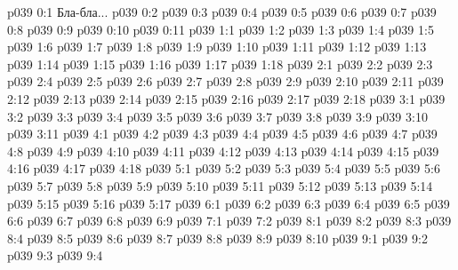 \author{Мелхиседек}
\vs p039 0:1  Бла-бла...
\vs p039 0:2 
\vs p039 0:3 
\vs p039 0:4 
\vs p039 0:5 
\vs p039 0:6 
\vs p039 0:7 
\vs p039 0:8 
\vs p039 0:9 \pc 
\vs p039 0:10 
\vs p039 0:11 
\vs p039 1:1 
\vs p039 1:2 
\vs p039 1:3 
\vs p039 1:4 \pc 
\vs p039 1:5 
\vs p039 1:6 
\vs p039 1:7 
\vs p039 1:8 
\vs p039 1:9 
\vs p039 1:10 
\vs p039 1:11 
\vs p039 1:12 
\vs p039 1:13 
\vs p039 1:14 
\vs p039 1:15 
\vs p039 1:16 
\vs p039 1:17 
\vs p039 1:18 
\vs p039 2:1 
\vs p039 2:2 
\vs p039 2:3 
\vs p039 2:4 
\vs p039 2:5 
\vs p039 2:6 
\vs p039 2:7 
\vs p039 2:8 
\vs p039 2:9 \pc 
\vs p039 2:10 \pc 
\vs p039 2:11 
\vs p039 2:12 
\vs p039 2:13 \pc 
\vs p039 2:14 
\vs p039 2:15 \pc 
\vs p039 2:16 
\vs p039 2:17 
\vs p039 2:18 \pc 
{}
\vs p039 3:1 
\vs p039 3:2 
\vs p039 3:3 
\vs p039 3:4 
\vs p039 3:5 
\vs p039 3:6 
\vs p039 3:7 
\vs p039 3:8 
\vs p039 3:9 
\vs p039 3:10 
\vs p039 3:11 
\vs p039 4:1 
\vs p039 4:2 
\vs p039 4:3 
\vs p039 4:4 
\vs p039 4:5 
\vs p039 4:6 
\vs p039 4:7 
\vs p039 4:8 
\vs p039 4:9 
\vs p039 4:10 
\vs p039 4:11 
\vs p039 4:12 \pc 
\vs p039 4:13 
\vs p039 4:14 
\vs p039 4:15 
\vs p039 4:16 
\vs p039 4:17 
\vs p039 4:18 
\vs p039 5:1 
\vs p039 5:2 
\vs p039 5:3 
\vs p039 5:4 
\vs p039 5:5 
\vs p039 5:6 
\vs p039 5:7 
\vs p039 5:8 
\vs p039 5:9 
\vs p039 5:10 
\vs p039 5:11 \pc 
\vs p039 5:12 
\vs p039 5:13 \pc 
\vs p039 5:14 
\vs p039 5:15 \pc 
\vs p039 5:16 
\vs p039 5:17 
\vs p039 6:1 
\vs p039 6:2 
\vs p039 6:3 
\vs p039 6:4 
\vs p039 6:5 
\vs p039 6:6 
\vs p039 6:7 
\vs p039 6:8 
\vs p039 6:9 \pc 
{}
\vs p039 7:1 
\vs p039 7:2 
\vs p039 8:1 
\vs p039 8:2 \pc 
\vs p039 8:3 
\vs p039 8:4 
\vs p039 8:5 
\vs p039 8:6 
\vs p039 8:7 \pc 
\vs p039 8:8 
\vs p039 8:9 \pc 
\vs p039 8:10 
\vs p039 9:1 
\vs p039 9:2 
\vs p039 9:3 
\vsetoff
\vs p039 9:4 
\quizlink
